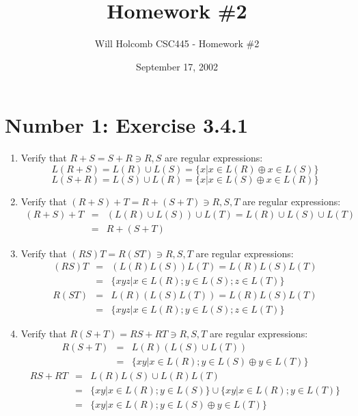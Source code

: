 \documentclass[12pt,a4paper,twoside]{article}  %
\author{Will Holcomb \small{CSC445 - Homework \#2}}
\title{Homework \#2}
\date{September 17, 2002}
\begin{document}
\maketitle

\section{Number 1: Exercise 3.4.1}
\begin{enumerate}

\item Verify that $R + S = S + R \ni R,S$ are regular expressions:
\begin{equation}
L(R + S) = L(R) \cup L(S) = \{x | x \in L(R) \oplus x \in L(S)\}
\end{equation}
\begin{equation}
L(S + R) = L(S) \cup L(R) = \{x | x \in L(S) \oplus x \in L(R)\}
\end{equation}

\item Verify that $(R + S) + T = R + (S + T) \ni R,S,T$ are regular expressions:
\begin{eqnarray}
(R + S) + T &=& (L(R) \cup L(S)) \cup L(T) = L(R) \cup L(S) \cup L(T) \nonumber\\
            &=& R + (S + T)
\end{eqnarray}

\item Verify that $(RS)T = R(ST) \ni R,S,T$ are regular expressions:
\begin{eqnarray}
(RS)T &=& (L(R)L(S))L(T) = L(R)L(S)L(T) \nonumber\\
      &=& \{xyz | x \in L(R); y \in L(S); z \in L(T)\}
\end{eqnarray}
\begin{eqnarray}
R(ST) &=& L(R)(L(S)L(T)) = L(R)L(S)L(T) \nonumber\\
      &=& \{xyz | x \in L(R); y \in L(S); z \in L(T)\}
\end{eqnarray}

\item Verify that $R(S + T) = RS + RT \ni R,S,T$ are regular expressions:
\begin{eqnarray}
R(S + T) &=& L(R)(L(S) \cup L(T)) \nonumber\\
         &=& \{xy | x \in L(R); y \in L(S) \oplus y \in L(T)\}
\end{eqnarray}
\begin{eqnarray}
RS + RT &=& L(R)L(S) \cup L(R)L(T) \nonumber\\
        &=& \{xy | x \in L(R); y \in L(S)\} \cup \{xy | x \in L(R); y \in L(T)\} \nonumber\\
        &=& \{xy | x \in L(R); y \in L(S) \oplus y \in L(T)\}
\end{eqnarray}


\end{enumerate}
\end{document}
